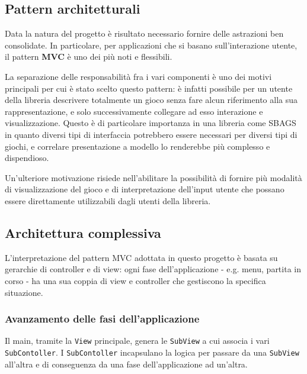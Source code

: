 \subsection{Pattern architetturali}
Data la natura del progetto è risultato necessario fornire delle astrazioni ben consolidate.
%
In particolare, per applicazioni che si basano sull'interazione utente, il pattern \textbf{MVC} è uno dei più noti e flessibili.

La separazione delle responsabilità fra i vari componenti è uno dei motivi principali per cui è stato scelto questo pattern: è infatti possibile per un utente della libreria descrivere totalmente un gioco senza fare alcun riferimento alla sua rappresentazione, e solo successivamente collegare ad esso interazione e visualizzazione.
%
Questo è di particolare importanza in una libreria come SBAGS in quanto diversi tipi di interfaccia potrebbero essere necessari per diversi tipi di giochi, e correlare presentazione a modello lo renderebbe più complesso e dispendioso.

Un'ulteriore motivazione risiede nell'abilitare la possibilità di fornire più modalità di visualizzazione del gioco e di interpretazione dell'input utente che possano essere direttamente utilizzabili dagli utenti della libreria. 

\subsection{Architettura complessiva}
L'interpretazione del pattern MVC adottata in questo progetto è basata su gerarchie di controller e di view: ogni fase dell'applicazione - e.g. menu, partita in corso - ha una sua coppia di view e controller che gestiscono la specifica situazione.

\subsubsection{Avanzamento delle fasi dell'applicazione}
Il main, tramite la \texttt{View} principale, genera le \texttt{SubView} a cui associa i vari \texttt{SubContoller}.
I \texttt{SubContoller} incapsulano la logica per passare da una \texttt{SubView} all'altra e di conseguenza da una fase dell'applicazione ad un'altra.

